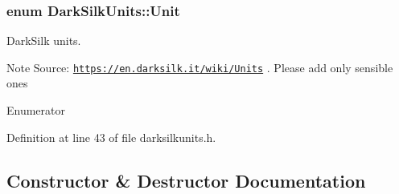 \subsubsection[{Unit}]{\setlength{\rightskip}{0pt plus 5cm}enum {\bf Dark\+Silk\+Units\+::\+Unit}}\label{class_dark_silk_units_a588cf5f654ad4aa646647ffde0031482}
Dark\+Silk units. \begin{DoxyNote}{Note}
Source\+: \href{https://en.darksilk.it/wiki/Units}{\tt https\+://en.\+darksilk.\+it/wiki/\+Units} . Please add only sensible ones 
\end{DoxyNote}
\begin{Desc}
\item[Enumerator]\par
\begin{description}
\item[{\em 
\hypertarget{class_dark_silk_units_a588cf5f654ad4aa646647ffde0031482a0edba4fddfbef1b8abc52ce9b516971d}{}D\+R\+K\+S\+L\+K\label{class_dark_silk_units_a588cf5f654ad4aa646647ffde0031482a0edba4fddfbef1b8abc52ce9b516971d}
}]\item[{\em 
\hypertarget{class_dark_silk_units_a588cf5f654ad4aa646647ffde0031482a347ccbe3f707cc1e89bde2f248721a33}{}m\+D\+R\+K\+S\+L\+K\label{class_dark_silk_units_a588cf5f654ad4aa646647ffde0031482a347ccbe3f707cc1e89bde2f248721a33}
}]\item[{\em 
\hypertarget{class_dark_silk_units_a588cf5f654ad4aa646647ffde0031482a7bb3975d2da154400a8062a9bf620305}{}u\+D\+R\+K\+S\+L\+K\label{class_dark_silk_units_a588cf5f654ad4aa646647ffde0031482a7bb3975d2da154400a8062a9bf620305}
}]\end{description}
\end{Desc}


Definition at line 43 of file darksilkunits.\+h.



\subsection{Constructor \& Destructor Documentation}
\hypertarget{class_dark_silk_units_a33ab49b1dfa2e509d005615832ec8eb0}{}
